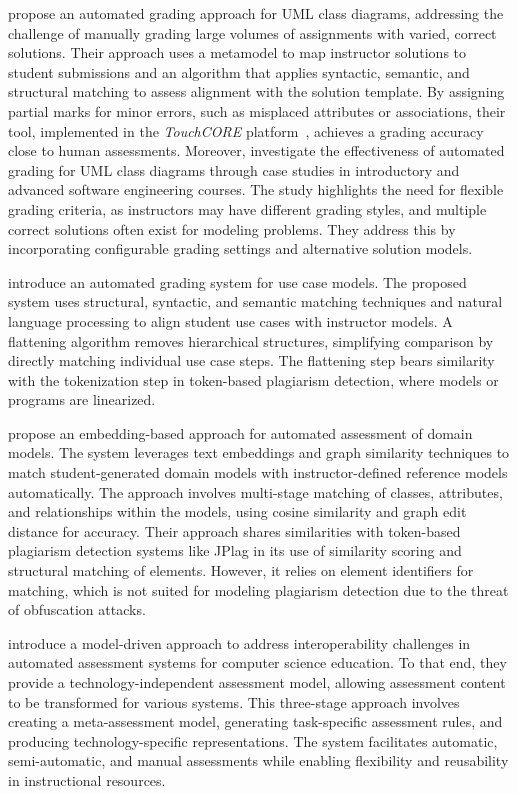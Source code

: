\citet{Bian2019} propose an automated grading approach for UML class diagrams, addressing the challenge of manually grading large volumes of assignments with varied, correct solutions. Their approach uses a metamodel to map instructor solutions to student submissions and an algorithm that applies syntactic, semantic, and structural matching to assess alignment with the solution template. By assigning partial marks for minor errors, such as misplaced attributes or associations, their tool, implemented in the \textit{TouchCORE} platform~\cite{schottle2015}, achieves a grading accuracy close to human assessments.
%
Moreover, \citet{Bian2020} investigate the effectiveness of automated grading for UML class diagrams through case studies in introductory and advanced software engineering courses. The study highlights the need for flexible grading criteria, as instructors may have different grading styles, and multiple correct solutions often exist for modeling problems. They address this by incorporating configurable grading settings and alternative solution models.

\citet{hosseinibaghdadabadi2023} introduce an automated grading system for use case models. The proposed system uses structural, syntactic, and semantic matching techniques and natural language processing to align student use cases with instructor models. A flattening algorithm removes hierarchical structures, simplifying comparison by directly matching individual use case steps. The flattening step bears similarity with the tokenization step in token-based plagiarism detection, where models or programs are linearized.

\citet{chen2024} propose an embedding-based approach for automated assessment of domain models. The system leverages text embeddings and graph similarity techniques to match student-generated domain models with instructor-defined reference models automatically. The approach involves multi-stage matching of classes, attributes, and relationships within the models, using cosine similarity and graph edit distance for accuracy.
%
Their approach shares similarities with token-based plagiarism detection systems like JPlag in its use of similarity scoring and structural matching of elements. However, it relies on element identifiers for matching, which is not suited for modeling plagiarism detection due to the threat of obfuscation attacks.

\citet{hamann2024} introduce a model-driven approach to address interoperability challenges in automated assessment systems for computer science education. To that end, they provide a technology-independent assessment model, allowing assessment content to be transformed for various systems. This three-stage approach involves creating a meta-assessment model, generating task-specific assessment rules, and producing technology-specific representations. The system facilitates automatic, semi-automatic, and manual assessments while enabling flexibility and reusability in instructional resources.

